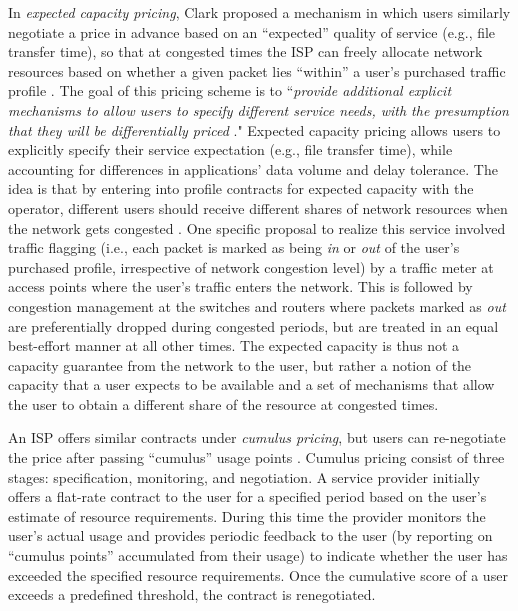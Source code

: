 In \emph{expected capacity pricing}, Clark proposed a mechanism in which users similarly negotiate a price in advance based on an ``expected'' quality of service (e.g., file transfer time), so that at congested times the ISP can freely allocate network resources based on whether a given packet lies ``within'' a user's purchased traffic profile \cite{DDClark}. The goal of this pricing scheme is to ``\emph{provide additional explicit mechanisms to allow users to specify different service needs, with the presumption that they will be differentially priced} \cite{DDClark}." Expected capacity pricing allows users to explicitly specify their service expectation (e.g., file transfer time), while accounting for differences in applications' data volume and delay tolerance. The idea is that by entering into profile contracts for expected capacity with the operator, different users should receive different shares of network resources when the network gets congested \cite{Songhurst}.  
One specific proposal to realize this service involved traffic flagging (i.e., each packet is marked as being \emph{in} or \emph{out} of the user's purchased profile, irrespective of network congestion level) by a traffic meter at access points where the user's traffic enters the network. This is followed by congestion management at the switches and routers where packets marked as \emph{out} are preferentially dropped during congested periods, but are treated in an equal best-effort manner at all other times.  The expected capacity is thus not a capacity guarantee from the network to the user, but rather a notion of the capacity that a user expects to be available and a set of mechanisms that allow the user to obtain a different share of the resource at congested times.  

An ISP offers similar contracts under \emph{cumulus pricing}, but users can re-negotiate the price after passing ``cumulus'' usage points \cite{Hayel}. Cumulus pricing consist of three stages: specification, monitoring, and negotiation. A service provider initially offers a flat-rate contract to the user for a specified period based on the user's estimate of resource requirements. During this time the provider monitors the user's actual usage and provides periodic feedback to the user (by reporting on ``cumulus points'' accumulated from their usage) to indicate whether the user has exceeded the specified resource requirements. Once the cumulative score of a user exceeds a predefined threshold, the contract is renegotiated. 

